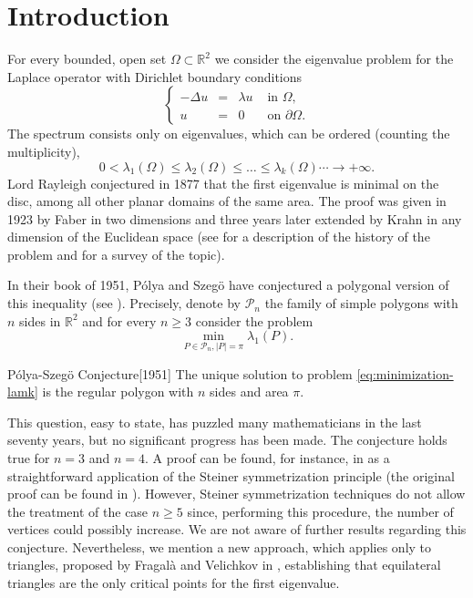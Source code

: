 \documentclass[JEP,XML,SOM,Unicode,ThmDefs,NoFloatCountersInSection,published]{cedram}
\theoremstyle{plain}
\theoremstyle{definition}
\newcommand{\Pol}[1]{\mathcal P_{#1}}
\let\Bbb\mathbb
\newcommand{\Om}{\Omega}
\newcommand{\lb}{\lambda}
\begin{document}
\maketitle
\tableofcontents
\mainmatter

\section{Introduction}

For every bounded, open set $\Omega \subset \Bbb{R}^2$ we consider the eigenvalue problem for the Laplace operator with Dirichlet boundary conditions
\begin{equation}\left\{ \begin{array}{rcll}
-\Delta u & =& \lambda u & \text{ in }\Omega,\\
u &= &0 & \text{ on }\partial \Omega.
\end{array} \right.
\label{eq:dir-eigenvalue}
\end{equation}
The spectrum consists only on eigenvalues, which can be ordered (counting the multiplicity),
\[
0< \lb_1(\Om) \le \lb_2(\Om) \le \dots \le \lb_k(\Om) \cdots \to +\infty.
\]
Lord Rayleigh conjectured in 1877 that the first eigenvalue is minimal on the disc, among all other planar domains of the same area. The proof was given in 1923 by Faber in two dimensions and three years later extended by Krahn in any dimension of the Euclidean space (see \cite{Da11} for a description of the history of the problem and \cite{he17b,henroteigs} for a survey of the topic).

In their book of 1951, Pólya and Szegö have conjectured a polygonal version of this inequality (see \cite[p.\,158]{PoSz51}). Precisely, denote by $\Pol{n}$ the family of simple polygons with $n$ sides in $\Bbb{R}^2$ and for every $n \geq 3$ consider the problem
\begin{equation}
\min_{P \in \Pol n, |P| = \pi} \lambda_1(P).
\label{eq:minimization-lamk}
\end{equation}

\begin{enonce*}{Pólya-Szegö Conjecture}[1951]
The unique solution to problem \eqref{eq:minimization-lamk} is the regular polygon with $n$ sides and area $\pi$.
\end{enonce*}

This question, easy to state, has puzzled many mathematicians in the last seventy years, but no significant progress has been made.
The conjecture holds true for $n=3$ and $n=4$. A proof can be found, for instance, in \cite{henroteigs} as a straightforward application of the Steiner symmetrization principle (the original proof can be found in \cite{PoSz51}). However, Steiner symmetrization techniques do not allow the treatment of the case $n \geq 5$ since, performing this procedure, the number of vertices could possibly increase. We are not aware of further results regarding this conjecture. Nevertheless, we mention a new approach, which applies only to triangles, proposed by Fragalà and Velichkov in \cite{FragalaVelichkov19}, establishing that equilateral triangles are the only critical points for the first eigenvalue.
\end{document}
